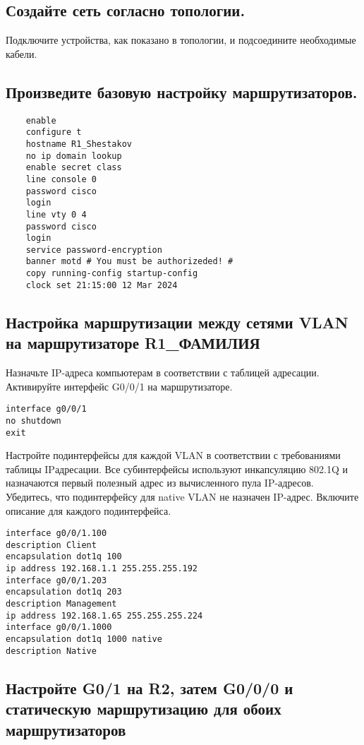 \subsection{Создайте сеть согласно топологии.}
Подключите устройства, как показано в топологии, и подсоедините необходимые кабели.

\subsection{Произведите базовую настройку маршрутизаторов.}
\begin{verbatim}
    enable
    configure t
    hostname R1_Shestakov
    no ip domain lookup
    enable secret class
    line console 0
    password cisco
    login
    line vty 0 4
    password cisco
    login
    service password-encryption
    banner motd # You must be authorizeded! #
    copy running-config startup-config
    clock set 21:15:00 12 Mar 2024
\end{verbatim}

\subsection{Настройка маршрутизации между сетями VLAN на маршрутизаторе R1\_ФАМИЛИЯ}
Назначьте IP-адреса компьютерам в соответствии с таблицей адресации.
Активируйте интерфейс G0/0/1 на маршрутизаторе.

\begin{verbatim}
interface g0/0/1
no shutdown
exit
\end{verbatim}

Настройте подинтерфейсы для каждой VLAN
в соответствии с требованиями таблицы IPадресации.
Все субинтерфейсы используют инкапсуляцию 802.1Q
и назначаются первый полезный адрес из вычисленного пула IP-адресов.
Убедитесь, что подинтерфейсу для native VLAN не назначен IP-адрес.
Включите описание для каждого подинтерфейса.

\begin{verbatim}
interface g0/0/1.100
description Client
encapsulation dot1q 100
ip address 192.168.1.1 255.255.255.192
interface g0/0/1.203
encapsulation dot1q 203
description Management
ip address 192.168.1.65 255.255.255.224
interface g0/0/1.1000
encapsulation dot1q 1000 native
description Native
\end{verbatim}

\subsection{Настройте G0/1 на R2, затем G0/0/0
и статическую маршрутизацию для обоих маршрутизаторов}

